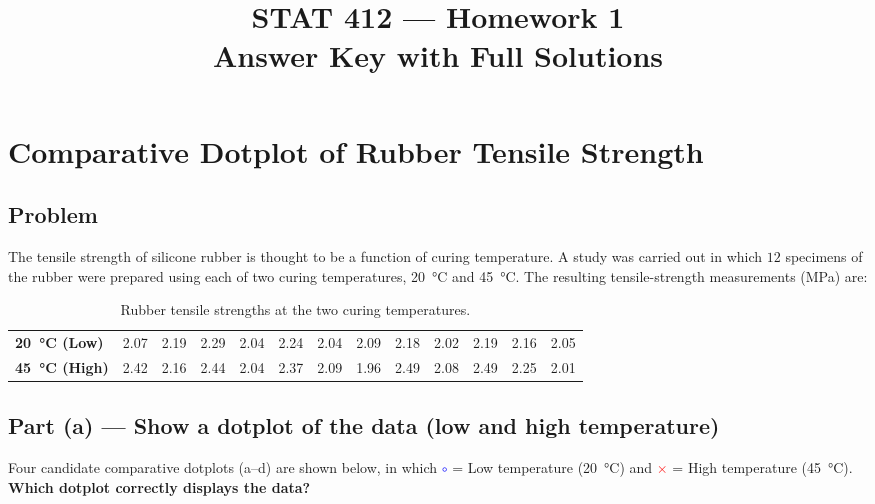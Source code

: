 \documentclass[11pt]{article}
\title{\vspace{-1.5em}\textbf{STAT 412 — Homework 1}\\[2pt]
       \large Answer Key with Full Solutions}
\author{}
\date{}
\begin{document}
\maketitle
\thispagestyle{fancy}
\vspace{-2.5em}

\section{Comparative Dotplot of Rubber Tensile Strength}

\subsection*{Problem}
The tensile strength of silicone rubber is thought to be a function of curing
temperature. A study was carried out in which $12$ specimens of the rubber were
prepared using each of two curing temperatures, \SI{20}{\celsius} and
\SI{45}{\celsius}. The resulting tensile-strength measurements (MPa) are:

\begin{table}[H]
\centering
\renewcommand{\arraystretch}{1.25}
\begin{tabular}{l *{12}{c}}
\toprule
\textbf{\SI{20}{\celsius} (Low)}
 & 2.07 & 2.19 & 2.29 & 2.04 & 2.24 & 2.04
 & 2.09 & 2.18 & 2.02 & 2.19 & 2.16 & 2.05 \\
\textbf{\SI{45}{\celsius} (High)}
 & 2.42 & 2.16 & 2.44 & 2.04 & 2.37 & 2.09
 & 1.96 & 2.49 & 2.08 & 2.49 & 2.25 & 2.01 \\
\bottomrule
\end{tabular}
\caption{Rubber tensile strengths at the two curing temperatures.}
\end{table}

\subsection*{Part (a) — Show a dotplot of the data (low and high temperature)}

\noindent
Four candidate comparative dotplots (a–d) are shown below, in which
\textcolor{blue}{$\circ$} = Low temperature (\SI{20}{\celsius}) and
\textcolor{red}{$\times$} = High temperature (\SI{45}{\celsius}).
\textbf{Which dotplot correctly displays the data?}
\end{document}
